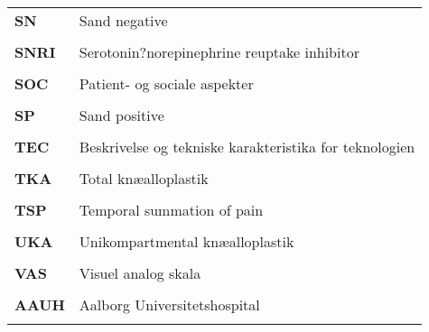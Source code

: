 \begin{longtable}{p{}  p{}}
\textbf{SN}  & Sand negative                                            
\\ \\
\textbf{SNRI}& Serotonin?norepinephrine reuptake inhibitor              
\\ \\
\textbf{SOC} & Patient- og sociale aspekter                             
\\ \\
\textbf{SP}  & Sand positive                                            
\\ \\
\textbf{TEC} & Beskrivelse og tekniske karakteristika for teknologien   
\\ \\
\textbf{TKA} & Total knæalloplastik                                     
\\ \\
\textbf{TSP} & Temporal summation of pain                               
\\ \\
\textbf{UKA} & Unikompartmental knæalloplastik                          
\\ \\
\textbf{VAS} & Visuel analog skala                                      
\\ \\
\textbf{AAUH}& Aalborg Universitetshospital                             
\\ \\
\end{longtable}
